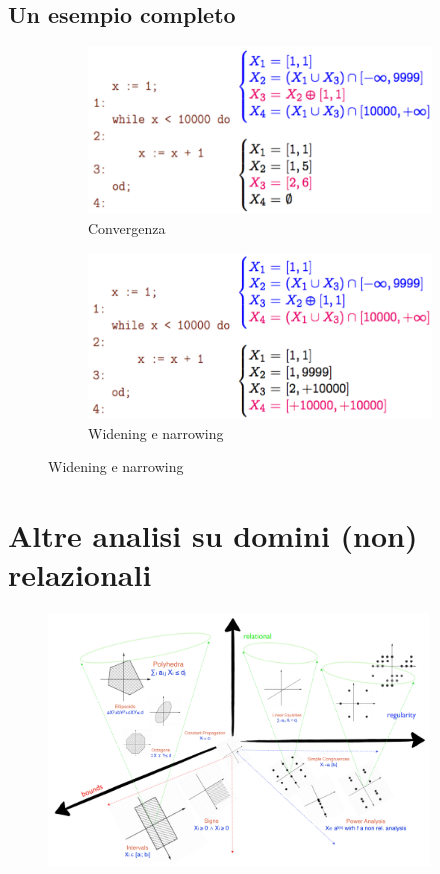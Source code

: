 \documentclass[a4paper,oneside,titlepage]{book}
\begin{document}
\subsection{Un esempio completo}
\begin{figure}[htp]
	\begin{subfigure}{0.49\textwidth}
	    \centering
		\includegraphics[width=\textwidth, height=\textheight, keepaspectratio]{intEx1.png}
		\caption{Convergenza}
	\end{subfigure}
	\hfill
	\begin{subfigure}{0.49\textwidth}
	    \centering
		\includegraphics[width=\textwidth, height=\textheight, keepaspectratio]{intEx2.png} 
		\caption{Widening e narrowing}
	\end{subfigure}
\end{figure}


\section{Altre analisi su domini (non) relazionali} %
\begin{figure}[htp]
	\centering
	\includegraphics[width=0.9\textwidth]{otherAnalysis.png}
\end{figure}
\end{document}
